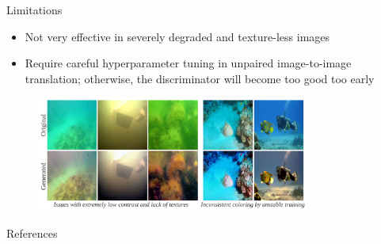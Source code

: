 \documentclass{cubeamer}
\begin{document}
\begin{frame}{Limitations}
    \begin{itemize}
        \item Not very effective in severely degraded and texture-less images
        \item Require careful hyperparameter tuning in unpaired image-to-image translation; otherwise, the discriminator will become too good too early
    \end{itemize}
    \vspace{-0.5cm}
    \begin{figure}
        \centering
        \includegraphics[width=0.8\textwidth]{figures/result-9.PNG}
    \end{figure}
\end{frame}


\begin{frame}{References}
    
    
\end{frame}
\end{document}
